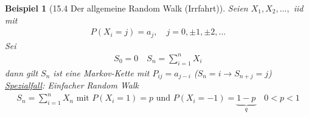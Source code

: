 \documentclass[a4paper,openany]{book}
\theoremstyle{mytheoremstyle}
\newtheorem*{bei}{Beispiel}
\theoremstyle{mytheoremstyle2}
\begin{document}
\begin{bei}[15.4 Der allgemeine Random Walk (Irrfahrt)]
  Seien $X_1,X_2,...,$ iid mit 
  \begin{align*}
    P(X_i=j)=a_j,\quad j=0,\pm 1, \pm 2,...
  \end{align*}
  Sei 
  \begin{align*}
    S_0=0\quad S_n=\sum_{i=1}^{n}{X_i}
  \end{align*}
  dann gilt $S_n$ ist eine Markov-Kette mit $P _{ij}=a _{j-i}$ ($S_n=i\rightarrow S _{n+j}=j$)\\
  \underline{Spezialfall}: Einfacher Random Walk
  \begin{align*}
    S_n=\sum_{i=1}^{n}{X_n}\text{ mit }P(X_i=1)=p \text{ und }P(X_i=-1)=\underbrace{1-p}_{q}\quad 0<p<1
  \end{align*}
  \begin{center}
  \end{center}
\end{bei}
\end{document}

